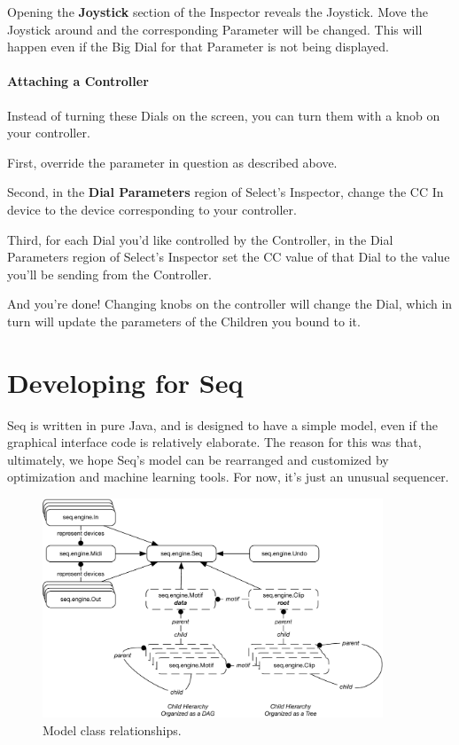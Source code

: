\documentclass[twoside,10pt]{article}
\begin{document}
Opening the {\bf Joystick} section of the Inspector reveals the Joystick.  Move the Joystick around and the corresponding Parameter will be changed.  This will happen even if the Big Dial for that Parameter is not being displayed.

\paragraph{Attaching a Controller}
Instead of turning these Dials on the screen, you can turn them with a knob on your controller.  

First, override the parameter in question as described above.

Second, in the {\bf Dial Parameters} region of Select's Inspector, change the CC In device to the device corresponding to your controller.

Third, for each Dial you'd like controlled by the Controller, in the Dial Parameters region of Select's Inspector set the CC value of that Dial to the value you'll be sending from the Controller.

And you're done!  Changing knobs on the controller will change the Dial, which in turn will update the parameters of the Children you bound to it.

\section{Developing for Seq}

Seq is written in pure Java, and is designed to have a simple model, even if the graphical interface code is relatively elaborate.  The reason for this was that, ultimately, we hope Seq's model can be rearranged and customized by optimization and machine learning tools.  For now, it's just an unusual sequencer.

\begin{figure}[t]
\centering
\includegraphics[width=4in]{model}
\caption{Model class relationships.}
\label{modeldev}
\end{figure}
\end{document}
